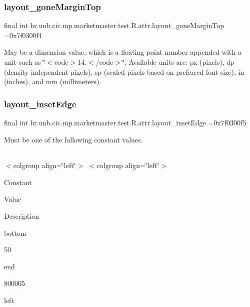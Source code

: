 \subsubsection{\texorpdfstring{layout\+\_\+gone\+Margin\+Top}{layout\_goneMarginTop}}
{\footnotesize\ttfamily final int br.\+unb.\+cic.\+mp.\+marketmaster.\+test.\+R.\+attr.\+layout\+\_\+gone\+Margin\+Top =0x7f0300f4\hspace{0.3cm}{\ttfamily [static]}}

May be a dimension value, which is a floating point number appended with a unit such as \char`\"{}$<$code$>$14.\+5sp$<$/code$>$\char`\"{}. Available units are\+: px (pixels), dp (density-\/independent pixels), sp (scaled pixels based on preferred font size), in (inches), and mm (millimeters). \mbox{\label{classbr_1_1unb_1_1cic_1_1mp_1_1marketmaster_1_1test_1_1R_1_1attr_a3c0ab1b3ef2d1d6414dd1a457d4e01f8}} 
\subsubsection{\texorpdfstring{layout\+\_\+inset\+Edge}{layout\_insetEdge}}
{\footnotesize\ttfamily final int br.\+unb.\+cic.\+mp.\+marketmaster.\+test.\+R.\+attr.\+layout\+\_\+inset\+Edge =0x7f0300f5\hspace{0.3cm}{\ttfamily [static]}}

Must be one of the following constant values.

\tabulinesep=1mm
\begin{longtabu} spread 0pt [c]{*{0}{|X[-1]}|}
\hline
\end{longtabu}
$<$colgroup align=\char`\"{}left\char`\"{}$>$ $<$colgroup align=\char`\"{}left\char`\"{}$>$ 

Constant

Value

Description 

bottom

50

end

800005

left

